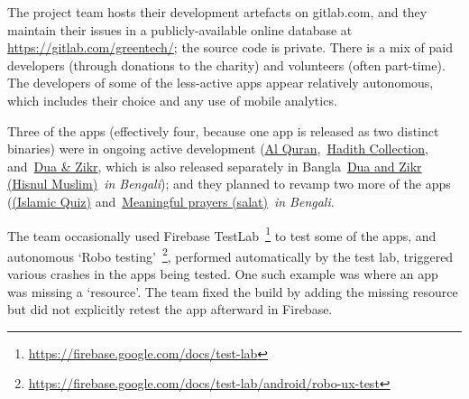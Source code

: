 
The project team hosts their development artefacts on gitlab.com, and they maintain their issues in a publicly-available online database at \url{https://gitlab.com/greentech/}; the source code is private. There is a mix of paid developers (through donations to the charity) and volunteers (often part-time). The developers of some of the less-active apps appear relatively autonomous, which includes their choice and any use of mobile analytics. 

Three of the apps (effectively four, because one app is released as two distinct binaries) were in ongoing active development (\href{https://play.google.com/store/apps/details?id=com.greentech.quran}{Al Quran},~\href{https://play.google.com/store/apps/details?id=com.greentech.hadith}{Hadith Collection}, and~\href{https://play.google.com/store/apps/details?id=com.greentech.hisnulmuslim}{Dua \& Zikr}, which is also released separately in Bangla~\href{https://play.google.com/store/apps/details?id=com.greentech.hisnulmuslimbn}{{Dua and Zikr (Hisnul Muslim)}}~\emph{in Bengali}); and they planned to revamp two more of the apps (\href{https://play.google.com/store/apps/details?id=com.greentech.islamicquiz}{(Islamic Quiz)} and~\href{https://play.google.com/store/apps/details?id=com.greentech.salatbn}{Meaningful prayers (salat)}~\textit{in Bengali}. %

The team occasionally used Firebase TestLab~\footnote{\url{https://firebase.google.com/docs/test-lab}} to test some of the apps, and autonomous `Robo testing'~\footnote{\url{https://firebase.google.com/docs/test-lab/android/robo-ux-test}}, performed automatically by the test lab, triggered various crashes in the apps being tested. One such example was where an app was missing a `resource'. The team fixed the build by adding the missing resource but did not explicitly retest the app afterward in Firebase.  


